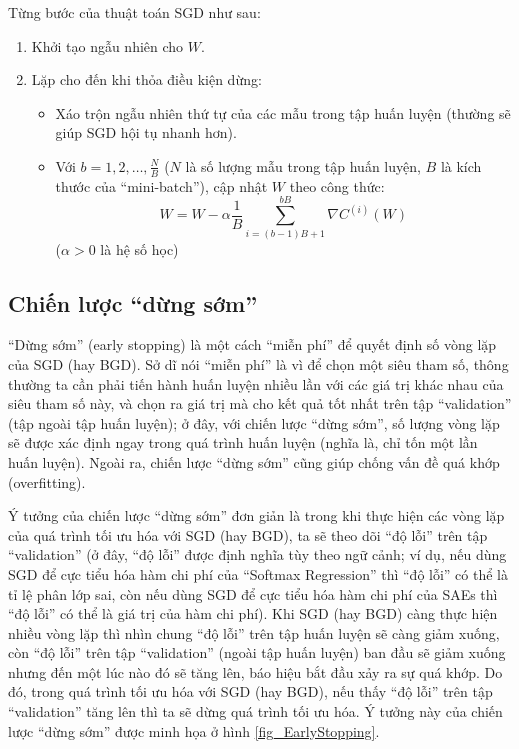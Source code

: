\begin{leftbar}
Từng bước của thuật toán SGD như sau:
\begin{enumerate}
	\item Khởi tạo ngẫu nhiên cho $W$.
	\item Lặp cho đến khi thỏa điều kiện dừng:
	\begin{itemize}
		\item Xáo trộn ngẫu nhiên thứ tự của các mẫu trong tập huấn luyện (thường sẽ giúp SGD hội tụ nhanh hơn).
		\item Với $b=1,2,\ldots,\frac{N}{B}$ ($N$ là số lượng mẫu trong tập huấn luyện, $B$ là kích thước của ``mini-batch''), cập nhật $W$ theo công thức:
		\[W = W - \alpha \frac{1}{B} \sum_{i=(b-1)B+1}^{bB} \nabla C^{(i)}(W)\]
		($\alpha > 0$ là hệ số học)
	\end{itemize}
\end{enumerate}
\end{leftbar}
\subsection{Chiến lược ``dừng sớm''}
``Dừng sớm'' (early stopping) là một cách ``miễn phí'' để quyết định số vòng lặp của SGD (hay BGD). Sở dĩ nói ``miễn phí'' là vì để chọn một siêu tham số, thông thường ta cần phải tiến hành huấn luyện nhiều lần với các giá trị khác nhau của siêu tham số này, và chọn ra giá trị mà cho kết quả tốt nhất trên tập ``validation'' (tập ngoài tập huấn luyện); ở đây, với chiến lược ``dừng sớm'', số lượng vòng lặp sẽ được xác định ngay trong quá trình huấn luyện (nghĩa là, chỉ tốn một lần huấn luyện). Ngoài ra, chiến lược ``dừng sớm'' cũng giúp chống vấn đề quá khớp (overfitting).

Ý tưởng của chiến lược ``dừng sớm'' đơn giản là trong khi thực hiện các vòng lặp của quá trình tối ưu hóa với SGD (hay BGD), ta sẽ theo dõi ``độ lỗi'' trên tập ``validation'' (ở đây, ``độ lỗi'' được định nghĩa tùy theo ngữ cảnh; ví dụ, nếu dùng SGD để cực tiểu hóa hàm chi phí của ``Softmax Regression'' thì ``độ lỗi'' có thể là tỉ lệ phân lớp sai, còn nếu dùng SGD để cực tiểu hóa hàm chi phí của SAEs thì ``độ lỗi'' có thể là giá trị của hàm chi phí). Khi SGD (hay BGD) càng thực hiện nhiều vòng lặp thì nhìn chung ``độ lỗi'' trên tập huấn luyện sẽ càng giảm xuống, còn ``độ lỗi'' trên tập ``validation'' (ngoài tập huấn luyện) ban đầu sẽ giảm xuống nhưng đến một lúc nào đó sẽ tăng lên, báo hiệu bắt đầu xảy ra sự quá khớp. Do đó, trong quá trình tối ưu hóa với SGD (hay BGD), nếu thấy ``độ lỗi'' trên tập ``validation'' tăng lên thì ta sẽ dừng quá trình tối ưu hóa. Ý tưởng này của chiến lược ``dừng sớm'' được minh họa ở hình \ref{fig_EarlyStopping}.

